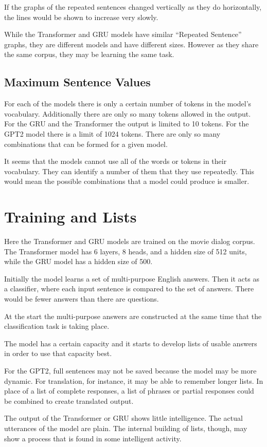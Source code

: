 If the graphs of the repeated sentences changed vertically as they do horizontally, the lines would be shown to increase very slowly.

While the Transformer and GRU models have similar ``Repeated Sentence'' graphs, they are different models and have different sizes. 
However as they share the same corpus, they may be learning the same task.

\subsection{Maximum Sentence Values}

For each of the models there is only a certain number of tokens in the model's vocabulary. Additionally there are only so many tokens allowed in the output. For the GRU and the Transformer the output is limited to 10 tokens. For the GPT2 model there is a limit of 1024 tokens. There are only so many combinations that can be formed for a given model.

It seems that the models cannot use all of the words or tokens in their vocabulary. They can identify a number of them that they use repeatedly. This would mean the possible combinations that a model could produce is smaller.

\section{Training and Lists}

Here the Transformer and GRU models are trained on the movie dialog corpus. The Transformer model has 6 layers, 8 heads, and a hidden size of 512 units, while the GRU model has a hidden size of 500.

Initially the model learns a set of multi-purpose English answers. Then it acts as a classifier, where each input sentence is compared to the set of answers. There would be fewer answers than there are questions. 

At the start the multi-purpose answers are constructed at the same time that the classification task is taking place. 

The model has a certain capacity and it starts to develop lists of usable answers in order to use that capacity best.

For the GPT2, full sentences may not be saved because the model may be more dynamic. For translation, for instance, it may be able to remember longer lists. In place of a list of complete responses, a list of phrases or partial responses could be combined to create translated output.

The output of the Transformer or GRU shows little intelligence. The actual utterances of the model are plain. The internal building of lists, though, may show a process that is found in some intelligent activity.